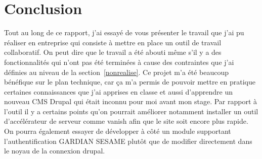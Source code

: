 \chapter{Conclusion} %

\label{Chapter4} %

Tout au long de ce rapport, j'ai essayé de vous présenter le travail que j'ai pu réaliser en entreprise qui consiste à mettre en place un outil de travail collaboratif.
On peut dire que le travail a été abouti même s'il y a des fonctionnalités qui n'ont pas été terminées à cause des contraintes que j'ai définies au niveau de la section~\ref{nonrealise}.
Ce projet m'a été beaucoup bénéfique sur le plan technique, car ça m'a permis de pouvoir mettre en pratique certaines connaissances que j'ai apprises en classe et aussi d'apprendre un nouveau CMS \og Drupal \fg{} qui était inconnu pour moi avant mon stage.
Par rapport à l'outil il y a certains points qu'on pourrait améliorer notamment installer un outil d'accélérateur de serveur comme vanish afin que le site soit encore plus rapide. On pourra également essayer de développer à côté un module supportant l'authentification GARDIAN SESAME plutôt que de modifier directement dans le noyau de la connexion drupal.